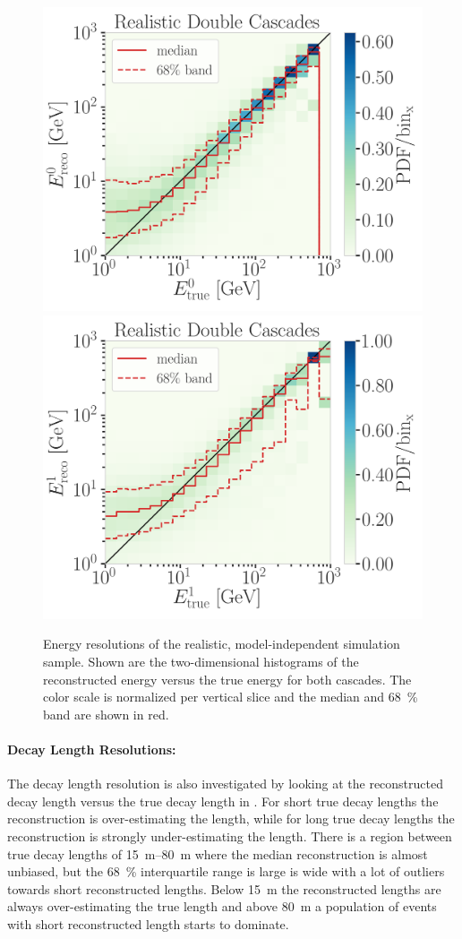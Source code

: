 \begin{figure}[h]
    \centering
    \includegraphics[width=0.49\linewidth]{figures/model_independent_simulation/results/realistic/2d_hists/194603_casc0_reco_energy_vs_casc0_true_energy_goodfit_step_contours.png}
    \includegraphics[width=0.49\linewidth]{figures/model_independent_simulation/results/realistic/2d_hists/194603_casc1_reco_energy_vs_casc1_true_energy_goodfit_step_contours.png}
    \caption[Realistic double cascade energy resolutions]{Energy resolutions of the realistic, model-independent simulation sample. Shown are the two-dimensional histograms of the reconstructed energy versus the true energy for both cascades. The color scale is normalized per vertical slice and the median and \SI{68}{\percent} band are shown in red.}
\end{figure}


\paragraph{Decay Length Resolutions:}

The decay length resolution is also investigated by looking at the reconstructed decay length versus the true decay length in . For short true decay lengths the reconstruction is over-estimating the length, while for long true decay lengths the reconstruction is strongly under-estimating the length. There is a region between true decay lengths of \SIrange[range-phrase=~and~]{15}{80}{\meter} where the median reconstruction is almost unbiased, but the \SI{68}{\percent} interquartile range is large is wide with a lot of outliers towards short reconstructed lengths. Below \SI{15}{\meter} the reconstructed lengths are always over-estimating the true length and above \SI{80}{\meter} a population of events with short reconstructed length starts to dominate.

